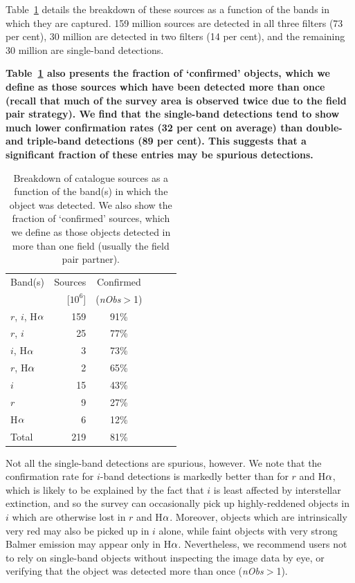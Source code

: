 \documentclass[a4paper,useAMS,usenatbib]{mn2e}
\def\ha{\mbox{H$\rm \alpha$}}
\begin{document}
Table~\ref{tbl:detections} details the breakdown of these
sources as a function of the bands in which they are captured.
159 million sources are detected in all three filters (73 per cent),
30 million are detected in two filters (14 per cent),
and the remaining 30 million are single-band detections.
{\bf
Table~\ref{tbl:detections} also presents 
the fraction of `confirmed' objects,
which we define as those sources
which have been detected more than once
(recall that much of the survey area
is observed twice due to the field pair strategy).
We find that the single-band detections tend
to show much lower confirmation rates (32 per cent on average)
than double- and triple-band detections (89 per cent).
This suggests that a significant fraction of
these entries may be spurious detections.

\begin{table}
    \caption{Breakdown of catalogue sources as a function of the band(s)
             in which the object was detected.
             We also show the fraction of `confirmed' sources,
             which we define as those objects
             detected in more than one field
             (usually the field pair partner).}
    \label{tbl:detections}
    \begin{center}
        \begin{tabular}{lrcccc}
        \toprule
        Band(s) & Sources & Confirmed \\
        & [$10^6$] & (\emph{nObs}$>$1) \\
        \midrule
        $r$, $i$, \ha & 159 & 91\% \\
        $r$, $i$ & 25 & 77\% \\
        $i$, \ha & 3 & 73\% \\
        $r$, \ha & 2 & 65\% \\
        $i$ & 15 & 43\% \\
        $r$ & 9 & 27\% \\
        \ha & 6 & 12\% \\
        \midrule
        Total  & 219 & 81\% \\
        \bottomrule
        \end{tabular}
	\end{center}
\end{table}

Not all the single-band detections are spurious, however.
We note that the confirmation rate for $i$-band detections
is markedly better than for $r$ and \ha,
which is likely to be explained by the fact that $i$ is least
affected by interstellar extinction, and so the survey can occasionally pick up
highly-reddened objects in $i$ which are otherwise lost in $r$ and \ha.
Moreover, objects which are intrinsically very red may also be picked
up in $i$ alone, while faint objects with very strong Balmer emission
may appear only in \ha.
Nevertheless, we recommend users not to rely on single-band objects
without inspecting the image data by eye,
or verifying that the object
was detected more than once (\emph{nObs}$>$1).
}
\end{document}
